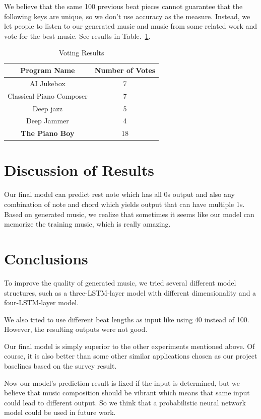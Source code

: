 \documentclass[conference]{IEEEtran}
\begin{document}
We believe that the same 100 previous beat pieces cannot guarantee that the following keys are unique, so we don't use accuracy as the measure. Instead, we let people to listen to our generated music and music from some related work and vote for the best music. See results in Table.~\ref{tab1}.

\begin{table}[htbp]
\caption{Voting Results}
\begin{center}
\begin{tabular}{|c|c|}
\hline
Program Name& Number of Votes\\
\hline
AI Jukebox& 7\\
Classical Piano Composer& 7\\
Deep jazz& 5\\
Deep Jammer& 4\\
\textbf{The Piano Boy}& 18\\
\hline
\end{tabular}
\label{tab1}
\end{center}
\end{table}

\section{Discussion of Results}
Our final model can predict rest note which has all 0s output and also any combination of note and chord which yields output that can have multiple 1s. Based on generated music, we realize that sometimes it seems like our model can memorize the training music, which is really amazing.

\section{Conclusions}
To improve the quality of generated music, we tried several different model structures, such as a three-LSTM-layer model with different dimensionality and a four-LSTM-layer model.

We also tried to use different beat lengths as input like using 40 instead of 100. However, the resulting outputs were not good.

Our final model is simply superior to the other experiments mentioned above. Of course, it is also better than some other similar applications chosen as our project baselines based on the survey result.

Now our model's prediction result is fixed if the input is determined, but we believe that music composition should be vibrant which means that same input could lead to different output. So we think that a probabilistic neural network model could be used in future work.
\end{document}
